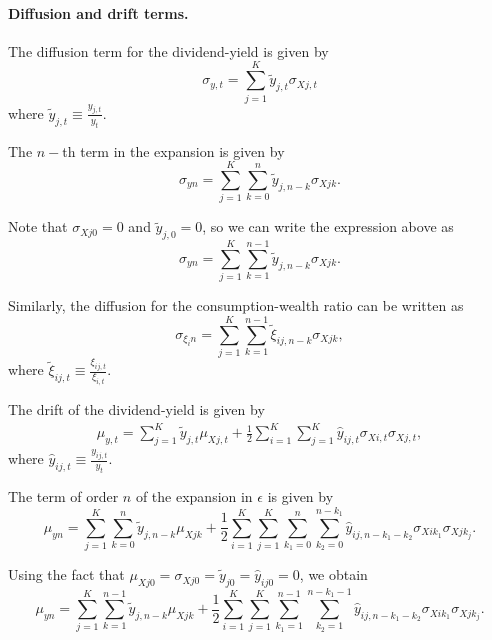 \documentclass[11pt,english]{article}
\begin{document}
\paragraph{Diffusion and drift terms.} The diffusion term for the dividend-yield is given by
\begin{equation}
    \sigma_{y,t} = \sum_{j=1}^K \tilde{y}_{j,t} \sigma_{Xj,t}
\end{equation}
where $\tilde{y}_{j,t} \equiv \frac{y_{j,t}}{y_{t}} $.

The $n-$th term in the expansion is given by
\begin{equation*}
    \sigma_{yn} = \sum_{j=1}^K \sum_{k=0}^n \tilde{y}_{j,n-k} \sigma_{Xjk}.
\end{equation*}

Note that $\sigma_{Xj0} = 0$ and $\tilde{y}_{j,0}=0$, so we can write the expression above as
\begin{equation*}
    \sigma_{yn} = \sum_{j=1}^K \sum_{k=1}^{n-1} \tilde{y}_{j,n-k} \sigma_{Xjk}.
\end{equation*}

Similarly, the diffusion for the consumption-wealth ratio can be written as
\begin{equation*}
    \sigma_{\xi_in} = \sum_{j=1}^K \sum_{k=1}^{n-1} \tilde{\xi}_{ij,n-k} \sigma_{Xjk},
\end{equation*}
where $\tilde{\xi}_{ij,t} \equiv \frac{\xi_{ij,t}}{\xi_{i,t}} $.

The drift of the dividend-yield is given by
\begin{align}
    \mu_{y,t} = \sum_{j=1}^K \tilde{y}_{j,t} \mu_{Xj,t} + \frac{1}{2} \sum_{i=1}^K \sum_{j=1}^K \hat{y}_{ij,t} \sigma_{Xi,t} \sigma_{Xj,t},
\end{align}
where $\hat{y}_{ij,t} \equiv \frac{y_{ij,t}}{y_{t}}$.

The term of order $n$ of the expansion in $\epsilon$ is given by
\begin{equation*}
    \mu_{yn} = \sum_{j=1}^K \sum_{k=0}^n \tilde{y}_{j,n-k} \mu_{Xjk} + \frac{1}{2} \sum_{i=1}^K \sum_{j=1}^K \sum_{k_1=0}^n \sum_{k_2=0}^{n-k_1}  \hat{y}_{ij,n-k_1-k_2} \sigma_{Xik_1} \sigma_{Xjk_j}.
\end{equation*}

Using the fact that $\mu_{Xj0} = \sigma_{Xj0} = \tilde{y}_{j0} = \hat{y}_{ij0} = 0$, we obtain
\begin{equation*}
    \mu_{yn} = \sum_{j=1}^K \sum_{k=1}^{n-1} \tilde{y}_{j,n-k} \mu_{Xjk} + \frac{1}{2} \sum_{i=1}^K \sum_{j=1}^K \sum_{k_1=1}^{n-1} \sum_{k_2=1}^{n-k_1-1}  \hat{y}_{ij,n-k_1-k_2} \sigma_{Xik_1} \sigma_{Xjk_j}.
\end{equation*}
\end{document}
